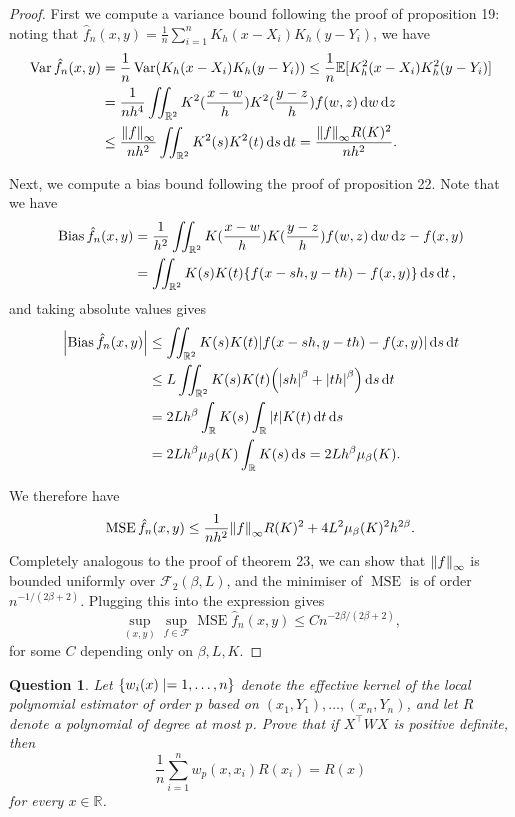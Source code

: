 \documentclass{article}
\theoremstyle{plain}
\newtheorem{question}{Question}
\theoremstyle{remark}
\newcommand{\Bb}{\mathbb}
\newcommand{\Cal}{\mathcal}
\newcommand{\RR}{\Bb R}
\newcommand{\EE}{\Bb E}
\newcommand\FF{\Cal F}
\newcommand{\T}{^\top} %
\DeclareMathOperator{\Var}{Var}
\DeclareMathOperator\MSE{MSE}
\DeclareMathOperator\Bias{Bias}
\begin{document}
\begin{proof}
	First we compute a variance bound following the proof of proposition 19: noting that $\hat f_n(x, y) = \frac1n \sum_{i=1}^n K_h(x - X_i) K_h(y - Y_i)$, we have
	\begin{align*}
		\Var \hat f_n(x, y) &= \frac1n \Var(K_h(x - X_i) K_h(y - Y_i)) \leq \frac1n \EE[K_h^2(x - X_i) K_h^2(y - Y_i)] \\
		&= \frac1{nh^4}  \iint_{\RR^2} K^2(\frac{x-w}{h}) K^2(\frac{y - z}{h}) f(w, z) \dd{w} \dd{z} \\
		&\leq  \frac{\norm{f}_\infty}{nh^2} \iint_{\RR^2} K^2(s) K^2(t) \dd{s} \dd{t} = \frac{\norm{f}_\infty R(K)^2}{nh^2}.
	\end{align*}

	Next, we compute a bias bound following the proof of proposition 22. Note that we have
	\begin{align*}
		\Bias \hat f_n(x, y) &= \frac1{h^2} \iint_{\RR^2} K(\frac{x-w}{h}) K(\frac{y-z}{h}) f(w, z) \dd{w}\dd{z} - f(x, y) \\
		&= \iint_{\RR^2} K(s) K(t)\qty{f(x - sh, y - th) - f(x, y)} \dd{s} \dd{t}, 
	\end{align*}
	and taking absolute values gives
	\begin{align*}
		\abs{\Bias\hat f_n(x, y)} &\leq \iint_{\RR^2} {K(s)} {K(t)} \abs{f(x - sh, y - th) - f(x, y)} \dd{s} \dd{t} \\
		&\leq L \iint_{\RR^2} {K(s)} {K(t)} \qty(\abs{sh}^\beta + \abs{th}^\beta) \dd{s} \dd{t} \\
		&= 2Lh^\beta \int_\RR {K(s)} \int_\RR \abs{t} {K(t)} \dd{t} \dd{s} \\
		&= 2Lh^\beta \mu_\beta(K) \int_\RR {K(s)} \dd{s} = 2Lh^\beta \mu_\beta(K). 
	\end{align*}
	
	We therefore have
	\[
	\MSE \hat f_n(x, y) \leq \frac1{nh^2} \norm{f}_\infty R(K)^2 + 4L^2\mu_\beta(K)^2 h^{2\beta}. 
	\]
	Completely analogous to the proof of theorem 23, we can show that $\norm{f}_\infty$ is bounded uniformly over $\FF_2(\beta, L)$, and the minimiser of $\MSE$ is of order $n^{-1/(2\beta + 2)}$. Plugging this into the expression gives 
	\[
	\sup_{(x, y)} \sup_{f \in \FF} \MSE \hat f_n(x, y) \leq C n^{-2\beta/(2\beta + 2)},
	\]
	for some $C$ depending only on $\beta, L, K$. 
\end{proof}

\begin{question}
	Let $\qty{w_i(x) \mid = 1, \dotsc, n}$ denote the effective kernel of the local polynomial estimator of order $p$ based on $(x_1, Y_1), \dotsc, (x_n, Y_n)$, and let $R$ denote a polynomial of degree at most $p$. Prove that if $X\T W X$ is positive definite, then
	\[
	\frac1n \sum_{i=1}^n w_p(x, x_i) R(x_i) = R(x)
	\]
	for every $x \in \RR$. 
\end{question}
\end{document}
